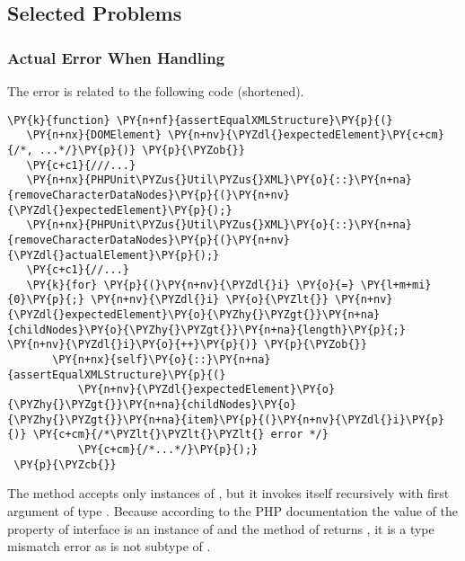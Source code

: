\subsection{Selected Problems}

\subsubsection*{Actual Error When Handling }

The error is related to the following code (shortened).

\begin{Verbatim}[commandchars=\\\{\}]
 \PY{k}{function} \PY{n+nf}{assertEqualXMLStructure}\PY{p}{(}
   \PY{n+nx}{DOMElement} \PY{n+nv}{\PYZdl{}expectedElement}\PY{c+cm}{/*, ...*/}\PY{p}{)} \PY{p}{\PYZob{}}
   \PY{c+c1}{///...}
   \PY{n+nx}{PHPUnit\PYZus{}Util\PYZus{}XML}\PY{o}{::}\PY{n+na}{removeCharacterDataNodes}\PY{p}{(}\PY{n+nv}{\PYZdl{}expectedElement}\PY{p}{);}
   \PY{n+nx}{PHPUnit\PYZus{}Util\PYZus{}XML}\PY{o}{::}\PY{n+na}{removeCharacterDataNodes}\PY{p}{(}\PY{n+nv}{\PYZdl{}actualElement}\PY{p}{);}
   \PY{c+c1}{//...}
   \PY{k}{for} \PY{p}{(}\PY{n+nv}{\PYZdl{}i} \PY{o}{=} \PY{l+m+mi}{0}\PY{p}{;} \PY{n+nv}{\PYZdl{}i} \PY{o}{\PYZlt{}} \PY{n+nv}{\PYZdl{}expectedElement}\PY{o}{\PYZhy{}\PYZgt{}}\PY{n+na}{childNodes}\PY{o}{\PYZhy{}\PYZgt{}}\PY{n+na}{length}\PY{p}{;} \PY{n+nv}{\PYZdl{}i}\PY{o}{++}\PY{p}{)} \PY{p}{\PYZob{}}
       \PY{n+nx}{self}\PY{o}{::}\PY{n+na}{assertEqualXMLStructure}\PY{p}{(}
           \PY{n+nv}{\PYZdl{}expectedElement}\PY{o}{\PYZhy{}\PYZgt{}}\PY{n+na}{childNodes}\PY{o}{\PYZhy{}\PYZgt{}}\PY{n+na}{item}\PY{p}{(}\PY{n+nv}{\PYZdl{}i}\PY{p}{)} \PY{c+cm}{/*\PYZlt{}\PYZlt{}\PYZlt{} error */}
           \PY{c+cm}{/*...*/}\PY{p}{);}
 \PY{p}{\PYZcb{}}
\end{Verbatim}

The method  accepts only instances 
of , but it invokes itself recursively with first 
argument of type . Because according to the 
PHP documentation the value of the  property 
of interface  is an instance of  
and the method  of  
returns , it is a type mismatch error as  
is not subtype of .


